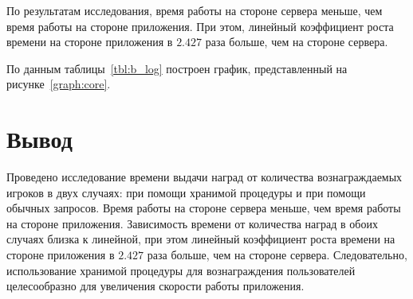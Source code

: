 По результатам исследования, время работы на стороне сервера меньше, чем время работы на стороне приложения. При этом, линейный коэффициент роста времени на стороне приложения в $2.427$ раза больше, чем на стороне сервера.

По данным таблицы~\ref{tbl:b_log} построен график, представленный на рисунке~\ref{graph:core}.

\section*{Вывод}

Проведено исследование времени выдачи наград от количества вознаграждаемых игроков в двух случаях: при помощи хранимой процедуры и при помощи обычных запросов. Время работы на стороне сервера меньше, чем время работы на стороне приложения. Зависимость времени от количества наград в обоих случаях близка к линейной, при этом линейный коэффициент роста времени на стороне приложения в $2.427$ раза больше, чем на стороне сервера. Следовательно, использование хранимой процедуры для вознаграждения пользователей целесообразно для увеличения скорости работы приложения.

\clearpage
